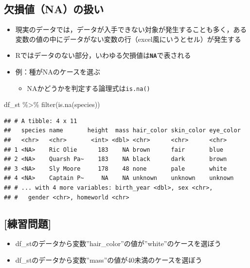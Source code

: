 \documentclass[
  xelatex,ja=standard, b5paper]{bxjsbook}
\newenvironment{Shaded}{\begin{snugshade}}{\end{snugshade}}
\newcommand{\FunctionTok}[1]{\textcolor[rgb]{0.00,0.00,0.00}{#1}}
\newcommand{\NormalTok}[1]{#1}
\newcommand{\SpecialCharTok}[1]{\textcolor[rgb]{0.00,0.00,0.00}{#1}}
\providecommand{\tightlist}{%
  \setlength{\itemsep}{0pt}\setlength{\parskip}{0pt}}
\begin{document}
\hypertarget{filter-st-na}{%
\subsection{欠損値（NA）の扱い}\label{filter-st-na}}

\begin{itemize}
\item
  現実のデータでは，データが入手できない対象が発生することも多く，ある変数の値の中にデータがない変数の行（excel風にいうとセル）が発生する
\item
  Rではデータのない部分，いわゆる欠損値は\textbf{\texttt{NA}}で表される
\item
  例：種がNAのケースを選ぶ

  \begin{itemize}
  \tightlist
  \item
    NAかどうかを判定する論理式は\texttt{is.na()}
  \end{itemize}
\end{itemize}

\begin{Shaded}
\begin{Highlighting}[]
\NormalTok{df\_st }\SpecialCharTok{\%\textgreater{}\%} 
  \FunctionTok{filter}\NormalTok{(}\FunctionTok{is.na}\NormalTok{(species))}
\end{Highlighting}
\end{Shaded}

\begin{verbatim}
## # A tibble: 4 x 11
##   species name       height  mass hair_color skin_color eye_color
##   <chr>   <chr>       <int> <dbl> <chr>      <chr>      <chr>    
## 1 <NA>    Ric Olie      183    NA brown      fair       blue     
## 2 <NA>    Quarsh Pa~    183    NA black      dark       brown    
## 3 <NA>    Sly Moore     178    48 none       pale       white    
## 4 <NA>    Captain P~     NA    NA unknown    unknown    unknown  
## # ... with 4 more variables: birth_year <dbl>, sex <chr>,
## #   gender <chr>, homeworld <chr>
\end{verbatim}

\hypertarget{ux7df4ux7fd2ux554fux984c-6}{%
\subsection{{[}練習問題{]}}\label{ux7df4ux7fd2ux554fux984c-6}}

\begin{itemize}
\tightlist
\item
  df\_stのデータから変数''hair\_color''の値が''white''のケースを選ぼう
\item
  df\_stのデータから変数''mass''の値が40未満のケースを選ぼう
\end{itemize}
\end{document}
